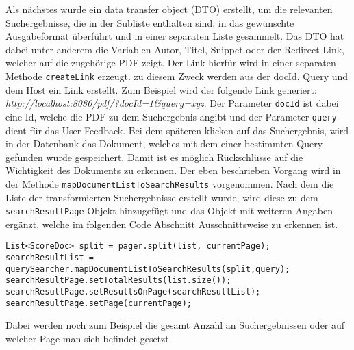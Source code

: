 Als nächstes wurde ein data transfer object (DTO) erstellt, um die relevanten Suchergebnisse, die in der Subliste enthalten sind, in das gewünschte Ausgabeformat überführt und in einer separaten  Liste gesammelt.
Das DTO hat dabei unter anderem die Variablen Autor, Titel, Snippet oder der Redirect Link, welcher auf die zugehörige PDF zeigt.   
Der Link hierfür wird in einer separaten Methode \texttt{createLink} erzeugt.
zu diesem Zweck werden aus der docId, Query und dem Host ein Link erstellt. 
Zum Beispiel wird der folgende Link generiert: \textit{http://localhost:8080/pdf/?docId=1\&query=xyz}.
Der Parameter \texttt{docId} ist dabei eine Id, welche die PDF zu dem Suchergebnis angibt und der Parameter \texttt{query} dient für das User-Feedback.
Bei dem späteren klicken auf das Suchergebnis, wird in der Datenbank das Dokument, welches mit dem einer bestimmten Query gefunden wurde gespeichert.
Damit ist es möglich Rückschlüsse auf die Wichtigkeit des Dokuments zu erkennen.
Der eben beschrieben Vorgang wird in der Methode \texttt{mapDocumentListToSearchResults} vorgenommen.
Nach dem die Liste der transformierten Suchergebnisse erstellt wurde, wird diese zu dem \texttt{searchResultPage} Objekt hinzugefügt und das Objekt mit weiteren Angaben ergänzt, welche im folgenden Code Abschnitt Ausschnittsweise zu erkennen ist.
\begin{lstlisting}
List<ScoreDoc> split = pager.split(list, currentPage);
searchResultList = querySearcher.mapDocumentListToSearchResults(split,query);
searchResultPage.setTotalResults(list.size());
searchResultPage.setResultsOnPage(searchResultList);
searchResultPage.setPage(currentPage);
\end{lstlisting}
Dabei werden noch zum Beispiel die gesamt Anzahl an Suchergebnissen oder auf welcher Page man sich befindet gesetzt.

